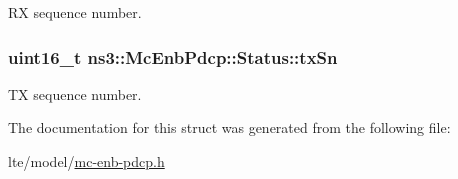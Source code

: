 RX sequence number. 

\subsubsection[{\texorpdfstring{tx\+Sn}{txSn}}]{\setlength{\rightskip}{0pt plus 5cm}uint16\+\_\+t ns3\+::\+Mc\+Enb\+Pdcp\+::\+Status\+::tx\+Sn}\hypertarget{structns3_1_1McEnbPdcp_1_1Status_ab6e2665b11999f6571c0207e9163d644}{}\label{structns3_1_1McEnbPdcp_1_1Status_ab6e2665b11999f6571c0207e9163d644}


TX sequence number. 



The documentation for this struct was generated from the following file\+:\begin{DoxyCompactItemize}
\item 
lte/model/\hyperlink{mc-enb-pdcp_8h}{mc-\/enb-\/pdcp.\+h}\end{DoxyCompactItemize}
